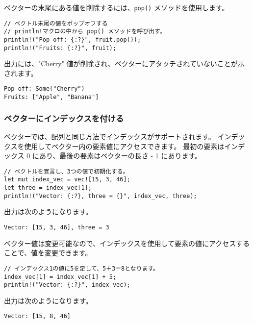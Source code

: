 ベクターの末尾にある値を削除するには、\texttt{pop()} メソッドを使用します。

\begin{lstlisting}[numbers=none]
// ベクトル末尾の値をポップオフする
// println!マクロの中から pop() メソッドを呼び出す。
println!("Pop off: {:?}", fruit.pop());
println!("Fruits: {:?}", fruit); 
\end{lstlisting}

出力には、"Cherry" 値が削除され、ベクターにアタッチされていないことが示されます。

\begin{lstlisting}[numbers=none]
Pop off: Some("Cherry")
Fruits: ["Apple", "Banana"]
\end{lstlisting}

\subsubsection{ベクターにインデックスを付ける}

ベクターでは、配列と同じ方法でインデックスがサポートされます。 インデックスを使用してベクター内の要素値にアクセスできます。 最初の要素はインデックス 0 にあり、最後の要素はベクターの長さ - 1 にあります。



\begin{lstlisting}[numbers=none]
// ベクトルを宣言し、3つの値で初期化する。
let mut index_vec = vec![15, 3, 46];
let three = index_vec[1];
println!("Vector: {:?}, three = {}", index_vec, three);  
\end{lstlisting}

出力は次のようになります。

\begin{lstlisting}[numbers=none]
Vector: [15, 3, 46], three = 3
\end{lstlisting}

ベクター値は変更可能なので、インデックスを使用して要素の値にアクセスすることで、値を変更できます。

\begin{lstlisting}[numbers=none]
// インデックス1の値に5を足して、5＋3＝8となります。
index_vec[1] = index_vec[1] + 5;
println!("Vector: {:?}", index_vec); 
\end{lstlisting}

出力は次のようになります。

\begin{lstlisting}[numbers=none]
Vector: [15, 8, 46]
\end{lstlisting}

